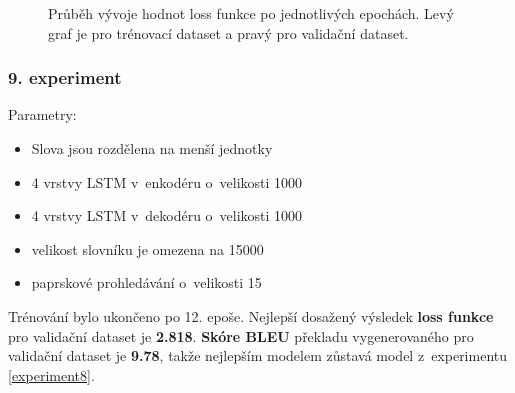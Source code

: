 \begin{figure}[H]
    \begin{center}
    \end{center}
	\caption{Průběh vývoje hodnot loss funkce po jednotlivých epochách. Levý graf je pro trénovací dataset a pravý pro validační dataset.}
\end{figure}

\subsubsection{9. experiment}\label{experiment9}
Parametry:
\begin{itemize}
  \item Slova jsou rozdělena na menší jednotky
  \item 4 vrstvy LSTM v~enkodéru o~velikosti 1000
  \item 4 vrstvy LSTM v~dekodéru o~velikosti 1000
  \item velikost slovníku je omezena na 15000
  \item paprskové prohledávání o~velikosti 15
\end{itemize}

Trénování bylo ukončeno po 12. epoše. Nejlepší dosažený výsledek \textbf{loss funkce} pro validační dataset je \textbf{2.818}. \textbf{Skóre BLEU} překladu vygenerovaného pro validační dataset je \textbf{9.78}, takže nejlepším modelem zůstavá model z~experimentu \ref{experiment8}.

